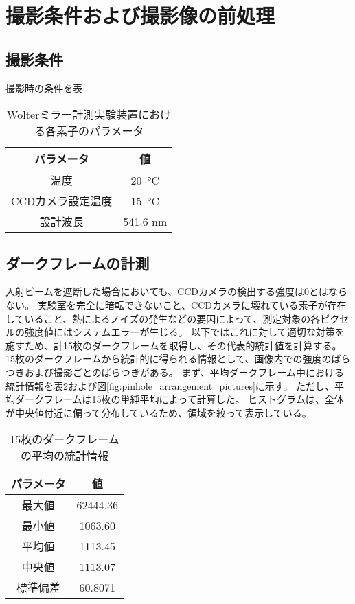 \clearpage
\newpage

\section{撮影条件および撮影像の前処理}

\subsection{撮影条件}
撮影時の条件を表

\begin{table}[!ht]
\begin{center}
  \begin{tabular}{|c|c|} \hline
    パラメータ & 値 \\ \hline
    温度 & \SI{20}{\degreeCelsius}  \\
    CCDカメラ設定温度 & \SI{15}{\degreeCelsius} \\
    設計波長 & 541.6 nm \\ \hline
  \end{tabular}
  \caption{Wolterミラー計測実験装置における各素子のパラメータ}
  \label{tb:mirror_experiment_params}
\end{center}
\end{table}


\subsection{ダークフレームの計測}
\label{chap5_darkflame_measurement}

入射ビームを遮断した場合においても、CCDカメラの検出する強度は0とはならない。
実験室を完全に暗転できないこと、CCDカメラに壊れている素子が存在していること、熱によるノイズの発生などの要因によって、測定対象の各ピクセルの強度値にはシステムエラーが生じる。
以下ではこれに対して適切な対策を施すため、計15枚のダークフレームを取得し、その代表的統計値を計算する。
15枚のダークフレームから統計的に得られる情報として、画像内での強度のばらつきおよび撮影ごとのばらつきがある。
まず、平均ダークフレーム中における統計情報を表\ref{tb:darkflame_average_data}および図\ref{fig:pinhole_arrangement_pictures}に示す。
ただし、平均ダークフレームは15枚の単純平均によって計算した。
ヒストグラムは、全体が中央値付近に偏って分布しているため、領域を絞って表示している。

\begin{table}[!ht]
\begin{center}
  \begin{tabular}{|c|c|} \hline
    パラメータ & 値 \\ \hline
    最大値 & 62444.36 \\
    最小値 & 1063.60 \\
    平均値 & 1113.45 \\
    中央値 & 1113.07 \\
    標準偏差 & 60.8071 \\ \hline
  \end{tabular}
  \caption{15枚のダークフレームの平均の統計情報}
  \label{tb:darkflame_average_data}
\end{center}
\end{table}

